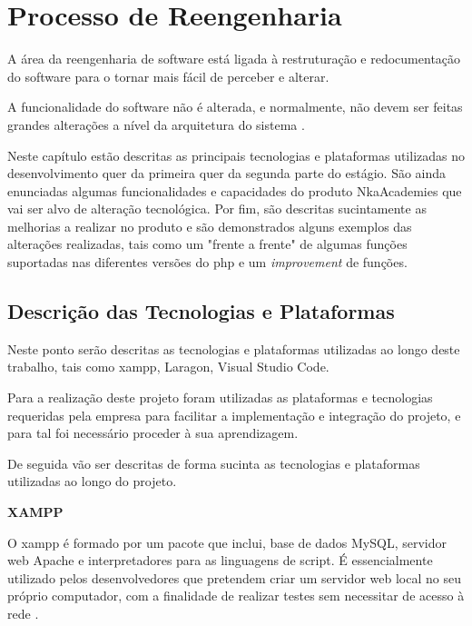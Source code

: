 
\chapter{Processo de Reengenharia}
\label{migracao}

A área da reengenharia de software está ligada à restruturação e redocumentação do software para o tornar mais fácil de perceber e alterar.

A funcionalidade do software não é alterada, e normalmente, não devem ser feitas grandes alterações a nível da arquitetura do sistema \citep{somerville}.

Neste capítulo estão descritas as principais tecnologias e plataformas utilizadas no desenvolvimento quer da primeira quer da segunda parte do estágio. São ainda enunciadas algumas funcionalidades e capacidades do produto NkaAcademies que vai ser alvo de alteração tecnológica. Por fim, são descritas sucintamente as melhorias a realizar no produto e são demonstrados alguns exemplos das alterações realizadas, tais como um "frente a frente"   de algumas funções suportadas nas diferentes versões do \acrshort{php} e um \textit{improvement} de funções.


\section{Descrição das Tecnologias e Plataformas}
\label{tecnologias}
Neste ponto serão descritas as tecnologias e plataformas utilizadas ao longo deste trabalho, tais como \acrshort{xampp}, Laragon, Visual Studio Code.

Para a realização deste projeto foram utilizadas as plataformas e tecnologias requeridas pela empresa para facilitar a implementação e integração do projeto, e para tal foi necessário proceder à sua aprendizagem.

De seguida vão ser descritas de forma sucinta as tecnologias e plataformas utilizadas ao longo do projeto.\newline


\textbf{XAMPP}

O \acrshort{xampp} é formado por um pacote que inclui, base de dados MySQL, servidor web Apache e interpretadores para as linguagens de script. É essencialmente utilizado pelos desenvolvedores que pretendem criar um servidor web local no seu próprio computador, com a finalidade de realizar testes sem necessitar de acesso à rede \citep{xampp}.\newline


